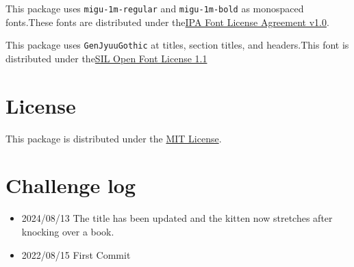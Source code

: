 \documentclass[
  pandoc]{mfg-article}
\providecommand{\tightlist}{%
  \setlength{\itemsep}{0pt}\setlength{\parskip}{0pt}}
\begin{document}
This package uses \texttt{migu-1m-regular} and \texttt{migu-1m-bold} as
monospaced fonts.These fonts are distributed under
the\href{https://mix-mplus-ipa.osdn.jp/migmix/IPA_Font_License_Agreement_v1.0.txt}{IPA
Font License Agreement v1.0}.

This package uses \texttt{GenJyuuGothic} at titles, section titles, and
headers.This font is distributed under
the\href{https://licenses.opensource.jp/OFL-1.1/OFL-1.1.html}{SIL Open
Font License 1.1}

\hypertarget{license}{%
\section{License}\label{license}}

This package is distributed under the \href{./LICENSE}{MIT License}.

\hypertarget{challenge-log}{%
\section{Challenge log}\label{challenge-log}}

\begin{itemize}
\tightlist
\item
  2024/08/13 The title has been updated and the kitten now stretches
  after knocking over a book.
\item
  2022/08/15 First Commit
\end{itemize}

\end{document}
